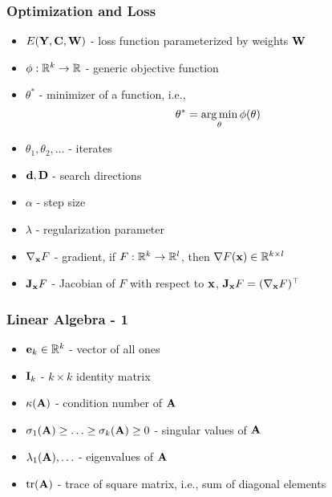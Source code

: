 \documentclass[12pt,fleqn]{beamer}
\begin{document}
\begin{frame}
	\frametitle{Optimization and Loss}
	
	\begin{itemize}
		\item $E({\bf Y},{\bf C},{\bf W})$ - loss function parameterized by weights ${\bf W}$
		\item $\phi : \mathbb{R}^{k} \to \mathbb{R}$ - generic objective function
		\item $\theta^*$ - minimizer of a function, i.e.,
		$$
			\theta^* = \operatorname*{arg\,min}_{\theta} \phi(\theta)
		$$
		\item $\theta_1,\theta_2, \ldots$ - iterates
		\item ${\bf d}, {\bf D}$ - search directions
		\item $\alpha$ - step size
		\item $\lambda$ - regularization parameter
		\item $\nabla_{\bf x} F$ - gradient, if $ F : \mathbb{R}^k \to \mathbb{R}^l $, then $\nabla F({\bf x}) \in \mathbb{R}^{k\times l}$
		\item ${\bf J}_{\bf x} F$ - Jacobian of $F$ with respect to ${\bf x}$, ${\bf J}_{{\bf x}} F = (\nabla_{\bf x} F)^\top$
	\end{itemize}
\end{frame}

 \begin{frame}
	\frametitle{Linear Algebra - 1}
	\begin{itemize}
		\item ${\bf e}_k \in\mathbb{R}^k$ - vector of all ones
		\item ${\bf I}_k$ - $k\times k$ identity matrix
		\item $\kappa({\bf A})$ - condition number of ${\bf A}$
		\item $\sigma_1({\bf A})\geq\ldots\geq\sigma_k({\bf A})\geq 0$ - singular values of ${\bf A}$
		\item $\lambda_1({\bf A}),\ldots$ - eigenvalues of ${\bf A}$
		\item ${\rm tr}({\bf A})$ - trace of square matrix, i.e., sum of diagonal elements
	\end{itemize}
\end{frame}
\end{document}
